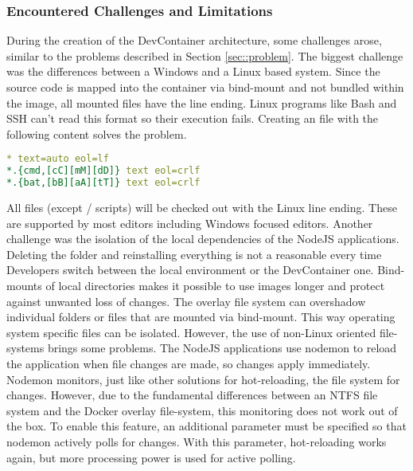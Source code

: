         \subsubsection{Encountered Challenges and Limitations}
        During the creation of the DevContainer architecture, some challenges arose, similar to the problems described in Section \ref{sec::problem}. The biggest challenge was the differences between a Windows and a Linux based system. Since the source code is mapped into the container via bind-mount and not bundled within the image, all mounted files have the  line ending. Linux programs like Bash and SSH can't read this format so their execution fails. Creating an  file with the following content solves the problem.
        \begin{lstlisting}[language=yml,frame=none, numbers=none, backgroundcolor=\color{codebg}]
* text=auto eol=lf
*.{cmd,[cC][mM][dD]} text eol=crlf
*.{bat,[bB][aA][tT]} text eol=crlf
        \end{lstlisting}
        \vspace{-0.5cm}
        All files (except / scripts) will be checked out with the Linux  line ending. These are supported by most editors including Windows focused editors.\newline
        Another challenge was the isolation of the local dependencies of the NodeJS applications. Deleting the  folder and reinstalling everything is not a reasonable every time Developers switch between the local environment or the DevContainer one. Bind-mounts of local directories makes it possible to use images longer and protect against unwanted loss of changes. The overlay file system can overshadow individual folders or files that are mounted via bind-mount. This way operating system specific files can be isolated. However, the use of non-Linux oriented file-systems brings some problems. The NodeJS applications use nodemon to reload the application when file changes are made, so changes apply immediately. Nodemon monitors, just like other solutions for hot-reloading, the file system for changes. However, due to the fundamental differences between an NTFS file system and the Docker overlay file-system, this monitoring does not work out of the box. To enable this feature, an additional parameter must be specified so that nodemon actively polls for changes. With this parameter, hot-reloading works again, but more processing power is used for active polling.\newline
